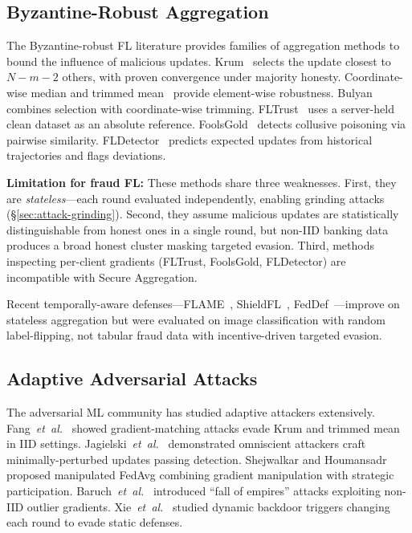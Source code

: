 \documentclass[10pt,journal]{IEEEtran}
\begin{document}
\subsection{Byzantine-Robust Aggregation}

The Byzantine-robust FL literature provides families of aggregation methods to bound the influence of malicious updates. Krum~\cite{blanchard2017} selects the update closest to $N-m-2$ others, with proven convergence under majority honesty. Coordinate-wise median and trimmed mean~\cite{yin2018} provide element-wise robustness. Bulyan~\cite{guerraoui2018} combines selection with coordinate-wise trimming. FLTrust~\cite{cao2021} uses a server-held clean dataset as an absolute reference. FoolsGold~\cite{fung2020} detects collusive poisoning via pairwise similarity. FLDetector~\cite{zhang2022} predicts expected updates from historical trajectories and flags deviations.

\textbf{Limitation for fraud FL:} These methods share three weaknesses. First, they are \emph{stateless}---each round evaluated independently, enabling grinding attacks (\S\ref{sec:attack-grinding}). Second, they assume malicious updates are statistically distinguishable from honest ones in a single round, but non-IID banking data produces a broad honest cluster masking targeted evasion. Third, methods inspecting per-client gradients (FLTrust, FoolsGold, FLDetector) are incompatible with Secure Aggregation.

Recent temporally-aware defenses---FLAME~\cite{shejwalkar2023}, ShieldFL~\cite{wang2024}, FedDef~\cite{zhang2024}---improve on stateless aggregation but were evaluated on image classification with random label-flipping, not tabular fraud data with incentive-driven targeted evasion.

\subsection{Adaptive Adversarial Attacks}

The adversarial ML community has studied adaptive attackers extensively. Fang~\textit{et~al.}~\cite{fang2020} showed gradient-matching attacks evade Krum and trimmed mean in IID settings. Jagielski~\textit{et~al.}~\cite{jagielski2018} demonstrated omniscient attackers craft minimally-perturbed updates passing detection. Shejwalkar and Houmansadr~\cite{shejwalkar2021} proposed manipulated FedAvg combining gradient manipulation with strategic participation. Baruch~\textit{et~al.}~\cite{baruch2019} introduced ``fall of empires'' attacks exploiting non-IID outlier gradients. Xie~\textit{et~al.}~\cite{xie2020} studied dynamic backdoor triggers changing each round to evade static defenses.
\end{document}
